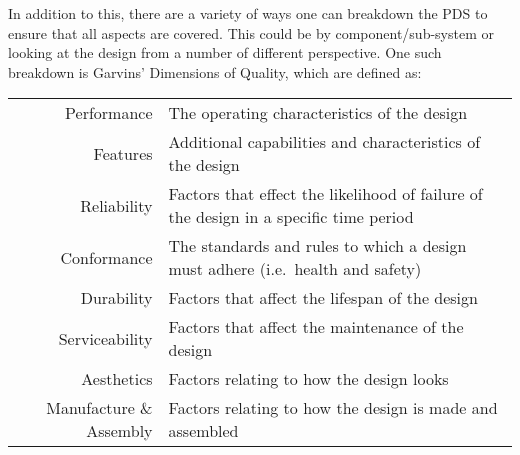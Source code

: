  In addition to this, there are a variety of ways one can breakdown the \ac{PDS} to ensure that all aspects are covered. This could be by component/sub-system or looking at the design from a number of different perspective. One such breakdown is Garvins' Dimensions of Quality\cite{garvin1987}, which are defined as:

\begin{table}
  \small
\begin{tabular}{r p{}}
  Performance & The operating characteristics of the design \\
  Features & Additional capabilities and characteristics of the design \\
  Reliability & Factors that effect the likelihood of failure of the design in a specific time period \\
  Conformance & The standards and rules to which a design must adhere (i.e.\ health and safety) \\
  Durability & Factors that affect the lifespan of the design \\
  Serviceability & Factors that affect the maintenance of the design \\
  Aesthetics & Factors relating to how the design looks \\
  Manufacture \& Assembly & Factors relating to how the design is made and assembled \\
\end{tabular}
\end{table}